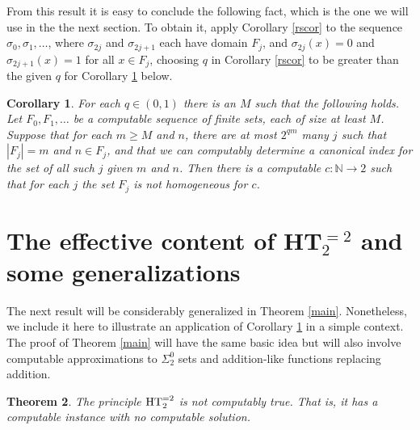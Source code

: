 \documentclass{amsart}
\newtheorem{thm}{Theorem}[section]
\newtheorem{cor}[thm]{Corollary}
\theoremstyle{definition}
\renewcommand{\geq}{\geqslant}
\begin{document}
From this result it is easy to conclude the following fact, which is
the one we will use in the the next section. To obtain it, apply
Corollary \ref{rscor} to the sequence $\sigma_0, \sigma_1, \dots$,
where $\sigma_{2j}$ and $\sigma_{2j+1}$ each have domain $F_j$, and
$\sigma_{2j}(x) = 0$ and $\sigma_{2j+1}(x) = 1$ for all $x \in F_j$,
choosing $q$ in Corollary \ref{rscor} to be greater than the given $q$
for Corollary \ref{usecor} below.

\begin{cor}
\label{usecor}
For each $q \in (0,1)$ there is an $M$ such that the following
holds. Let $F_0,F_1,\ldots$ be a computable sequence of finite sets,
each of size at least $M$. Suppose that for each $m \geq M$ and $n$,
there are at most $2^{qm}$ many $j$ such that $|F_j|=m$ and $n \in
F_j$, and that we can computably determine a canonical index for the
set of all such $j$ given $m$ and $n$. Then there is a computable $c :
\mathbb N \rightarrow 2$ such that for each $j$ the set $F_j$ is not
homogeneous for $c$.
\end{cor}


\section{The effective content of HT$^{=2}_2$ and some generalizations}
\label{results}

The next result will be considerably generalized in Theorem
\ref{main}. Nonetheless, we include it here to illustrate an
application of Corollary \ref{usecor} in a simple context. The proof
of Theorem \ref{main} will have the same basic idea but will also
involve computable approximations to $\Sigma^0_2$ sets and
addition-like functions replacing addition.

\begin{thm}
\label{comp}
The principle $\textup{HT}^{=2}_2$ is not computably true. That is,
it has a computable instance with no computable solution.
\end{thm}
\end{document}
